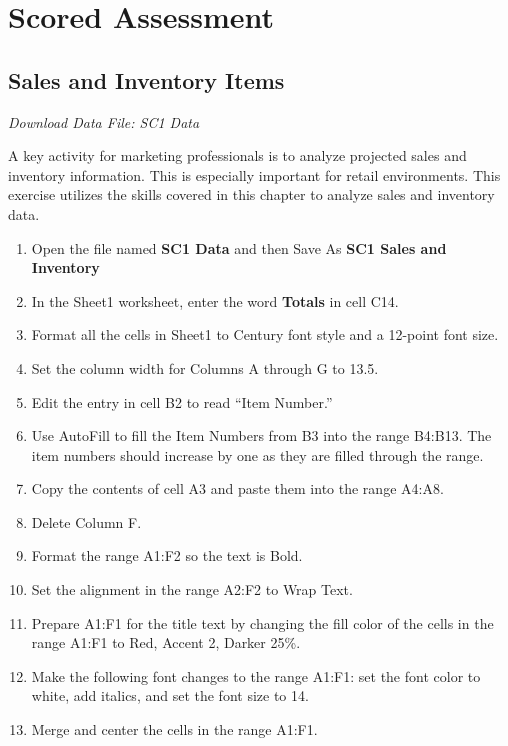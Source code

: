 \section{Scored Assessment}

\subsection{Sales and Inventory Items}

\textit{Download Data File: SC1 Data}

A key activity for marketing professionals is to analyze projected sales and inventory information. This is especially important for retail environments. This exercise utilizes the skills covered in this chapter to analyze sales and inventory data.

\begin{enumerate}
	\item Open the file named \textbf{SC1 Data} and then Save As \textbf{SC1 Sales and Inventory}
	\item In the Sheet1 worksheet, enter the word \textbf{Totals} in cell \textsf{C14}.
	\item Format all the cells in Sheet1 to Century font style and a 12-point font size.
	\item Set the column width for Columns \textsf{A} through \textsf{G} to 13.5.
	\item Edit the entry in cell \textsf{B2} to read ``Item Number.''
	\item Use AutoFill to fill the Item Numbers from \textsf{B3} into the range \textsf{B4:B13}. The item numbers should increase by one as they are filled through the range.
	\item Copy the contents of cell \textsf{A3} and paste them into the range \textsf{A4:A8}.
	\item Delete Column \textsf{F}.
	\item Format the range \textsf{A1:F2} so the text is Bold.
	\item Set the alignment in the range \textsf{A2:F2} to Wrap Text.
	\item Prepare \textsf{A1:F1} for the title text by changing the fill color of the cells in the range \textsf{A1:F1} to Red, Accent 2, Darker 25\%.
	\item Make the following font changes to the range \textsf{A1:F1}: set the font color to white, add italics, and set the font size to 14.
	\item Merge and center the cells in the range \textsf{A1:F1}.

\end{enumerate}

